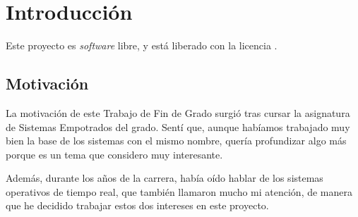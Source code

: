 \chapter{Introducción}

Este proyecto es \emph{software} libre, y está liberado con la licencia \cite{gplv3}.

\section{Motivación}

La motivación de este Trabajo de Fin de Grado surgió tras cursar la asignatura de Sistemas Empotrados del grado. Sentí que, aunque habíamos trabajado muy bien la base de los sistemas con el mismo nombre, quería profundizar algo más porque es un tema que considero muy interesante. 

Además, durante los años de la carrera, había oído hablar de los sistemas operativos de tiempo real, que también llamaron mucho mi atención, de manera que he decidido trabajar estos dos intereses en este proyecto.  

